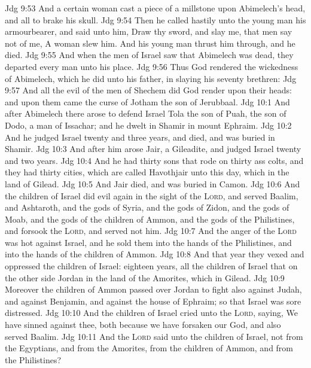 \vs Jdg 9:53 And a certain woman cast a piece of a millstone upon Abimelech's head, and all to brake his skull.
\vs Jdg 9:54 Then he called hastily unto the young man his armourbearer, and said unto him, Draw thy sword, and slay me, that men say not of me, A woman slew him. And his young man thrust him through, and he died.
\vs Jdg 9:55 And when the men of Israel saw that Abimelech was dead, they departed every man unto his place.
\vs Jdg 9:56 Thus God rendered the wickedness of Abimelech, which he did unto his father, in slaying his seventy brethren:
\vs Jdg 9:57 And all the evil of the men of Shechem did God render upon their heads: and upon them came the curse of Jotham the son of Jerubbaal.
\vs Jdg 10:1 And after Abimelech there arose to defend Israel Tola the son of Puah, the son of Dodo, a man of Issachar; and he dwelt in Shamir in mount Ephraim.
\vs Jdg 10:2 And he judged Israel twenty and three years, and died, and was buried in Shamir.
\vs Jdg 10:3 And after him arose Jair, a Gileadite, and judged Israel twenty and two years.
\vs Jdg 10:4 And he had thirty sons that rode on thirty ass colts, and they had thirty cities, which are called Havothjair unto this day, which  in the land of Gilead.
\vs Jdg 10:5 And Jair died, and was buried in Camon.
\vs Jdg 10:6 And the children of Israel did evil again in the sight of the \textsc{Lord}, and served Baalim, and Ashtaroth, and the gods of Syria, and the gods of Zidon, and the gods of Moab, and the gods of the children of Ammon, and the gods of the Philistines, and forsook the \textsc{Lord}, and served not him.
\vs Jdg 10:7 And the anger of the \textsc{Lord} was hot against Israel, and he sold them into the hands of the Philistines, and into the hands of the children of Ammon.
\vs Jdg 10:8 And that year they vexed and oppressed the children of Israel: eighteen years, all the children of Israel that  on the other side Jordan in the land of the Amorites, which  in Gilead.
\vs Jdg 10:9 Moreover the children of Ammon passed over Jordan to fight also against Judah, and against Benjamin, and against the house of Ephraim; so that Israel was sore distressed.
\vs Jdg 10:10 And the children of Israel cried unto the \textsc{Lord}, saying, We have sinned against thee, both because we have forsaken our God, and also served Baalim.
\vs Jdg 10:11 And the \textsc{Lord} said unto the children of Israel,  not  from the Egyptians, and from the Amorites, from the children of Ammon, and from the Philistines?
